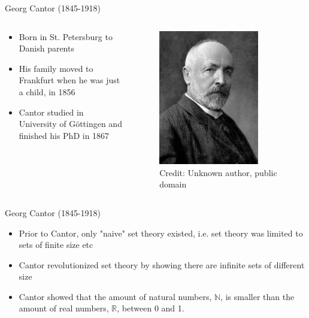 \documentclass[utf8]{beamer}
\begin{document}
\begin{frame}{Georg Cantor (1845-1918)}
\begin{columns}
\begin{column}{0.6\textwidth}
\begin{itemize}
\item Born in St. Petersburg to Danish parents
\item His family moved to Frankfurt when he was just a child, in 1856
\item Cantor studied in University of G{\"o}ttingen and finished his PhD in 1867
\end{itemize}
\end{column}
\begin{column}{0.4\textwidth}
\begin{figure}
\centering
\includegraphics[width=0.8\textwidth]{images/cantor.png}
\\
\tiny Credit: Unknown author, public domain
\end{figure}
\end{column}
\end{columns}
\end{frame}

\begin{frame}{Georg Cantor (1845-1918)}
\begin{itemize}
\item Prior to Cantor, only "naive" set theory existed, i.e. set theory was limited to sets of finite size etc
\item Cantor revolutionized set theory by showing there are infinite sets of different size
\item Cantor showed that the amount of natural numbers, $\mathbb{N}$, is smaller than the amount of real numbers,
$\mathbb{R}$, between 0 and 1.
\end{itemize}
\end{frame}
\end{document}
